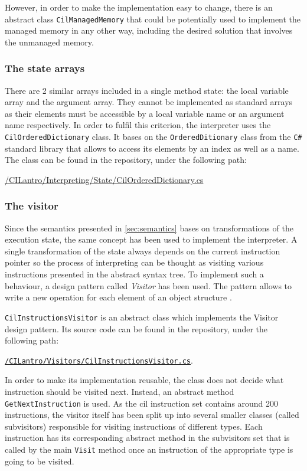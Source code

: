 \documentclass{article}
\numberwithin{equation}{section}
\begin{document}
However, in order to make the implementation easy to change, there is an abstract class \texttt{CilManagedMemory} that could be potentially used to implement the managed memory in any other way, including the desired solution that involves the unmanaged memory.

\subsubsection{The state arrays}

There are 2 similar arrays included in a single method state: the local variable array and the argument array. They cannot be implemented as standard arrays as their elements must be accessible by a local variable name or an argument name respectively. In order to fulfil this criterion, the interpreter uses the \texttt{CilOrderedDictionary} class. It bases on the \texttt{OrderedDitionary} class from the \texttt{C\#} standard library that allows to access its elements by an index as well as a name. The class can be found in the repository, under the following path:
\begin{center}
	\href{https://github.com/kvasnyk/CILantro/blob/master/CILantro/CILantro/Interpreting/State/CilOrderedDictionary.cs}{/CILantro/Interpreting/State/CilOrderedDictionary.cs}
\end{center}

\subsubsection{The visitor}
\label{sec:visitor}

Since the semantics presented in \ref{sec:semantics} bases on transformations of the execution state, the same concept has been used to implement the interpreter. A single transformation of the state always depends on the current instruction pointer so the process of interpreting can be thought as visiting various instructions presented in the abstract syntax tree. To implement such a behaviour, a design pattern called \textit{Visitor} has been used. The pattern allows to write a new operation for each element of an object structure \cite{designPatterns}.

\texttt{CilInstructionsVisitor} is an abstract class which implements the Visitor design pattern. Its source code can be found in the repository, under the following path:
\begin{center}
\href{https://github.com/kvasnyk/CILantro/blob/master/CILantro/CILantro/Visitors/CilInstructionsVisitor.cs}{\texttt{/CILantro/Visitors/CilInstructionsVisitor.cs}}.
\end{center}
In order to make its implementation reusable, the class does not decide what instruction should be visited next. Instead, an abstract method \texttt{GetNextInstruction} is used. As the \acrshort{cil} instruction set contains around 200 instructions, the visitor itself has been split up into several smaller classes (called subvisitors) responsible for visiting instructions of different types. Each instruction has its corresponding abstract method in the subvisitors set that is called by the main \texttt{Visit} method once an instruction of the appropriate type is going to be visited.
\end{document}
